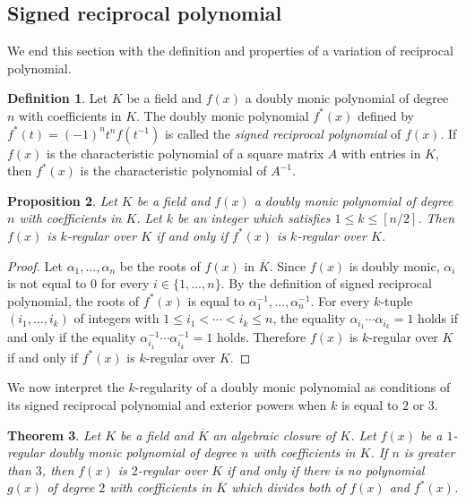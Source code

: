 \documentclass{amsart}
\theoremstyle{plain}
\newtheorem{thm}{Theorem}[section]
\newtheorem{prop}[thm]{Proposition}
\theoremstyle{definition}
\newtheorem{defn}[thm]{Definition}
\theoremstyle{remark}
\begin{document}

\subsection{Signed reciprocal polynomial}

We end this section with the definition and properties of a variation of reciprocal polynomial. 

\begin{defn}
Let $K$ be a field and $f(x)$ a doubly monic polynomial of degree $n$ with coefficients in $K$. 
The doubly monic polynomial $f^*(x)$ defined by $f^*(t)=(-1)^nt^nf(t^{-1})$ is called the 
{\it signed reciprocal polynomial} of $f(x)$. 
If $f(x)$ is the characteristic polynomial of a square matrix $A$ with entries in $K$, 
then $f^*(x)$ is the characteristic polynomial of $A^{-1}$. 
\end{defn}

\begin{prop}\label{reg*}
Let $K$ be a field and $f(x)$ a doubly monic polynomial of degree $n$ with coefficients in $K$. 
Let $k$ be an integer which satisfies $1\leq k\leq [n/2]$. 
Then $f(x)$ is $k$-regular over $K$ if and only if $f^*(x)$ is $k$-regular over $K$. 
\end{prop}

\begin{proof}
Let $\alpha_1,\ldots ,\alpha_n$ be the roots of $f(x)$ in $\overline{K}$. 
Since $f(x)$ is doubly monic, $\alpha_i$ is not equal to $0$ for every $i\in\{1,\ldots ,n\}$. 
By the definition of signed reciprocal polynomial, the roots of $f^*(x)$ is equal to 
$\alpha_1^{-1},\ldots ,\alpha_n^{-1}$. 
For every $k$-tuple $(i_1,\ldots ,i_k)$ of integers with $1\leq i_1<\cdots <i_k\leq n$, the equality 
$\alpha_{i_1}\cdots \alpha_{i_k}=1$ holds if and only if the equality 
$\alpha_{i_1}^{-1}\cdots \alpha_{i_k}^{-1}=1$ holds. Therefore 
$f(x)$ is $k$-regular over $K$ if and only if $f^*(x)$ is $k$-regular over $K$. 
\end{proof}

We now interpret the $k$-regularity of a doubly monic polynomial as conditions of 
its signed reciprocal polynomial and exterior powers when $k$ is equal to $2$ or $3$. 

\begin{thm}\label{2-regular}
Let $K$ be a field and $\overline{K}$ an algebraic closure of $K$. 
Let $f(x)$ be a $1$-regular doubly monic polynomial of degree $n$ with coefficients in $K$. 
If $n$ is greater than $3$, then 
$f(x)$ is $2$-regular over $K$ if and only if there is no polynomial $g(x)$ of degree $2$ 
with coefficients in $\overline{K}$ which divides both of $f(x)$ and $f^*(x)$. 
\end{thm}
\end{document}
